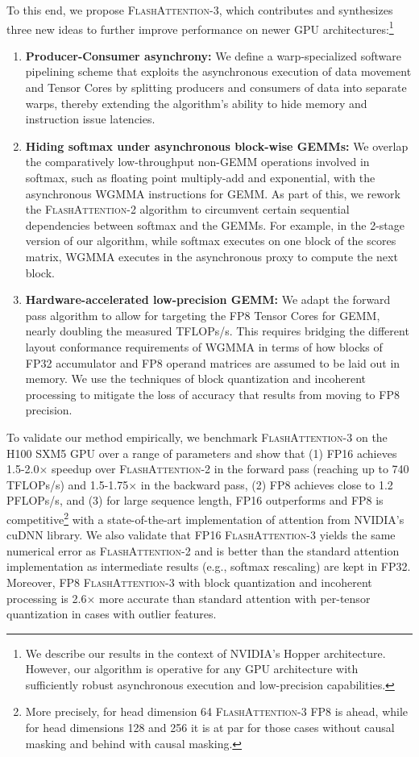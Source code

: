 To this end, we propose \textsc{FlashAttention-3}, which contributes and synthesizes three new ideas to further improve performance on newer GPU architectures:\footnote{We describe our results in the context of NVIDIA's Hopper architecture. However, our algorithm is operative for any GPU architecture with sufficiently robust asynchronous execution and low-precision capabilities.}

\begin{enumerate}

\item \textbf{Producer-Consumer asynchrony:} We define a warp-specialized software pipelining scheme that exploits the asynchronous execution of data movement and Tensor Cores by splitting producers and consumers of data into separate warps, thereby extending the algorithm's ability to hide memory and instruction issue latencies.
\item \textbf{Hiding softmax under asynchronous block-wise GEMMs:} We overlap the comparatively low-throughput non-GEMM operations involved in softmax, such as floating point multiply-add and exponential, with the asynchronous WGMMA instructions for GEMM. As part of this, we rework the \textsc{FlashAttention-2} algorithm to circumvent certain sequential dependencies between softmax and the GEMMs. For example, in the 2-stage version of our algorithm, while softmax executes on one block of the scores matrix, WGMMA executes in the asynchronous proxy to compute the next block.
\item \textbf{Hardware-accelerated low-precision GEMM:} We adapt the forward pass algorithm to allow for targeting the FP8 Tensor Cores for GEMM, nearly doubling the measured TFLOPs/s. This requires bridging the different layout conformance requirements of WGMMA in terms of how blocks of FP32 accumulator and FP8 operand matrices are assumed to be laid out in memory. We use the techniques of block quantization and incoherent processing to mitigate the loss of accuracy that results from moving to FP8 precision.
\end{enumerate}

To validate our method empirically, we benchmark \textsc{FlashAttention-3} on the H100 SXM5 GPU over a range of parameters and show that (1) FP16 achieves 1.5-2.0$\times$ speedup over
\textsc{FlashAttention-2} in the forward pass (reaching up to 740 TFLOPs/s) and 1.5-1.75$\times$ in the backward pass, (2) FP8 achieves close to 1.2 PFLOPs/s, and (3) for large sequence length, FP16 outperforms and FP8 is
competitive\footnote{More precisely, for head dimension 64 \textsc{FlashAttention-3} FP8 is ahead, while for head dimensions 128 and 256 it is at par for those cases without causal masking and behind with causal masking.} with a state-of-the-art implementation of attention from NVIDIA's cuDNN library. We also validate that FP16 \textsc{FlashAttention-3} yields the same numerical error as \textsc{FlashAttention-2} and is better than the standard attention implementation as intermediate results (e.g., softmax rescaling) are kept in FP32. Moreover, FP8 \textsc{FlashAttention-3} with block quantization and incoherent processing is 2.6$\times$ more accurate than standard attention with per-tensor quantization in cases with outlier features.

